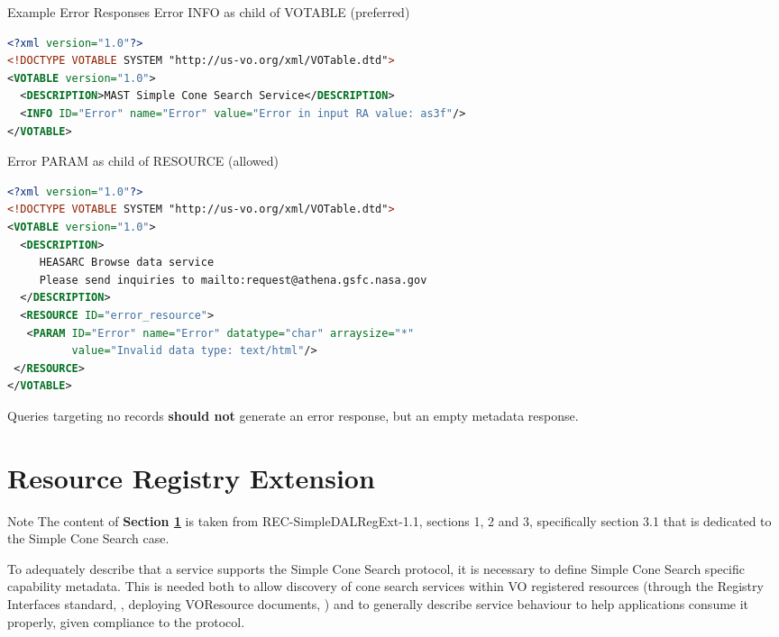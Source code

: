 \documentclass[11pt,a4paper]{ivoa}
\begin{document}
\begin{bigdescription}
	\item[Example Error Responses] Error INFO as child of VOTABLE (preferred)\\
	\begin{lstlisting}[language=XML,basicstyle=\footnotesize]
<?xml version="1.0"?>
<!DOCTYPE VOTABLE SYSTEM "http://us-vo.org/xml/VOTable.dtd">
<VOTABLE version="1.0">
  <DESCRIPTION>MAST Simple Cone Search Service</DESCRIPTION>
  <INFO ID="Error" name="Error" value="Error in input RA value: as3f"/>
</VOTABLE>
	\end{lstlisting}
	Error PARAM as child of RESOURCE (allowed)
	\begin{lstlisting}[language=XML,basicstyle=\footnotesize]
<?xml version="1.0"?>
<!DOCTYPE VOTABLE SYSTEM "http://us-vo.org/xml/VOTable.dtd">
<VOTABLE version="1.0">
  <DESCRIPTION>
     HEASARC Browse data service
     Please send inquiries to mailto:request@athena.gsfc.nasa.gov
  </DESCRIPTION>
  <RESOURCE ID="error_resource">
   <PARAM ID="Error" name="Error" datatype="char" arraysize="*"
          value="Invalid data type: text/html"/>
 </RESOURCE>
</VOTABLE>
	\end{lstlisting}
\end{bigdescription}

Queries targeting no records \textbf{should not} generate an error response, but an empty metadata response.

\section{Resource Registry Extension}
\label{sec:regext}

\begin{admonition}{Note}
The content of \textbf{Section \ref{sec:regext}} is taken from REC-SimpleDALRegExt-1.1, sections 1, 2 and 3, specifically section 3.1 that is dedicated to the Simple Cone Search case.
\end{admonition}

To adequately describe that a service supports the Simple Cone Search
protocol, it is necessary to define Simple Cone Search specific
capability metadata. This is needed both to allow discovery of cone
search services within VO registered resources (through the Registry
Interfaces standard, \citet{std:RI1}, deploying VOResource documents,
\citet{std:VOR}) and to generally describe service behaviour to help
applications consume it properly, given compliance to the protocol.
\end{document}
